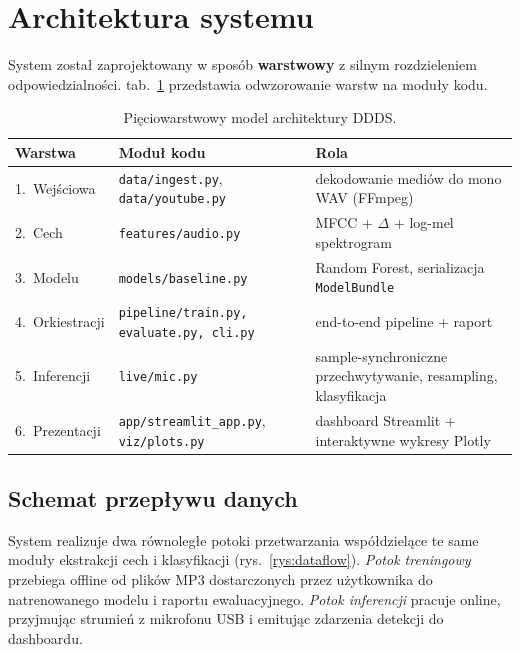 \documentclass[11pt,a4paper]{article}
\newcommand{\tabref}[1]{tab.~\ref{#1}}
\newcommand{\rysref}[1]{rys.~\ref{#1}}
\begin{document}
\section{Architektura systemu}

System został zaprojektowany w sposób \textbf{warstwowy} z silnym rozdzieleniem
odpowiedzialności. \tabref{tab:warstwy} przedstawia odwzorowanie warstw na
moduły kodu.

\begin{table}[H]
\centering
\caption{Pięciowarstwowy model architektury DDDS.}
\label{tab:warstwy}
\begin{tabularx}{\linewidth}{llX}
\toprule
\textbf{Warstwa} & \textbf{Moduł kodu} & \textbf{Rola} \\
\midrule
1.~Wejściowa  & \texttt{data/ingest.py}, \texttt{data/youtube.py}
              & dekodowanie mediów do mono WAV (FFmpeg) \\
2.~Cech       & \texttt{features/audio.py}
              & MFCC + $\Delta$ + log-mel spektrogram \\
3.~Modelu     & \texttt{models/baseline.py}
              & Random Forest, serializacja \texttt{ModelBundle} \\
4.~Orkiestracji & \texttt{pipeline/train.py, evaluate.py, cli.py}
              & end-to-end pipeline + raport \\
5.~Inferencji & \texttt{live/mic.py}
              & sample-synchroniczne przechwytywanie, resampling, klasyfikacja \\
6.~Prezentacji & \texttt{app/streamlit\_app.py}, \texttt{viz/plots.py}
              & dashboard Streamlit + interaktywne wykresy Plotly \\
\bottomrule
\end{tabularx}
\end{table}

\subsection{Schemat przepływu danych}

System realizuje dwa równoległe potoki przetwarzania współdzielące te same
moduły ekstrakcji cech i klasyfikacji (\rysref{rys:dataflow}).
\emph{Potok treningowy} przebiega offline od plików MP3 dostarczonych przez
użytkownika do natrenowanego modelu i raportu ewaluacyjnego. \emph{Potok
inferencji} pracuje online, przyjmując strumień z mikrofonu USB i emitując
zdarzenia detekcji do dashboardu.
\end{document}
